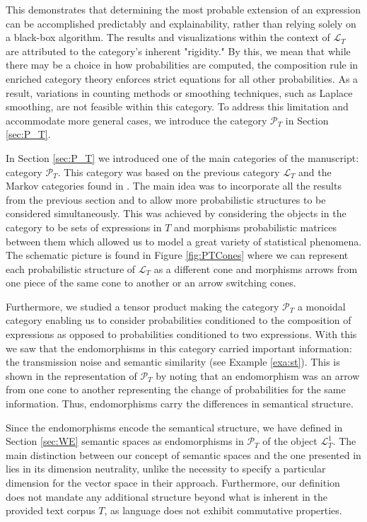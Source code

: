 \documentclass[10pt,a4paper]{elsarticle}
\renewcommand{\L}{\mathcal{L}}
\renewcommand{\P}{\mathcal{P}}
\begin{document}
This demonstrates that determining the most probable extension of an expression can be accomplished predictably and explainability, rather than relying solely on a black-box algorithm. The results and visualizations within the context of $\L_{T}$ are attributed to the category's inherent "rigidity." By this, we mean that while there may be a choice in how probabilities are computed, the composition rule in enriched category theory enforces strict equations for all other probabilities. As a result, variations in counting methods or smoothing techniques, such as Laplace smoothing, are not feasible within this category. To address this limitation and accommodate more general cases, we introduce the category $\P_{T}$ in Section \ref{sec:P_T}.

In Section \ref{sec:P_T} we introduced one of the main categories of the manuscript: category $\P_{T}$. This category was based on the previous category $\L_{T}$ and the Markov categories found in \cite{fritz2023representable,perrone2023markov}. The main idea was to incorporate all the results from the previous section and to allow more probabilistic structures to be considered simultaneously. This was achieved by considering the objects in the category to be sets of expressions in $T$ and morphisms probabilistic matrices between them which allowed us to model a great variety of statistical phenomena. The schematic picture is found in Figure \ref{fig:PTCones} where we can represent each probabilistic structure of $\L_{T}$ as a different cone and morphisms arrows from one piece of the same cone to another or an arrow switching cones.

Furthermore, we studied a tensor product making the category $\P_{T}$ a monoidal category enabling us to consider probabilities conditioned to the composition of expressions as opposed to probabilities conditioned to two expressions. With this we saw that the endomorphisms in this category carried important information: the transmission noise and semantic similarity (see Example \ref{exa:st}). This is shown in the representation of $\P_{T}$ by noting that an endomorphism was an arrow from one cone to another representing the change of probabilities for the same information. Thus, endomorphisms carry the differences in semantical structure.

Since the endomorphisms encode the semantical structure, we have defined in Section \ref{sec:WE} semantic spaces as endomorphisms in $\P_{T}$ of the object $\L_{T}^{1}$. The main distinction between our concept of semantic spaces and the one presented in \citep{hashimoto2016word} lies in its dimension neutrality, unlike the necessity to specify a particular dimension for the vector space in their approach. Furthermore, our definition does not mandate any additional structure beyond what is inherent in the provided text corpus $T$, as language does not exhibit commutative properties.
\end{document}
